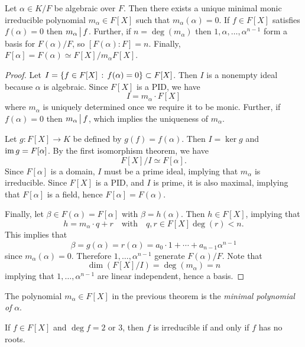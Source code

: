 \begin{thm}
	Let $\alpha \in K/F$ be algebraic over $F$. Then there exists a unique minimal monic irreducible polynomial $m_\alpha \in F[X]$ such that $m_\alpha(\alpha) = 0$. If $f \in F[X]$ satisfies $f(\alpha) = 0$ then $m_\alpha \,\big\vert\, f$. Further, if $n = \deg(m_\alpha)$ then $1, \alpha, \ldots, \alpha^{n-1}$ form a basis for $F(\alpha)/F$, so $[F(\alpha):F] = n$. Finally, $F[\alpha] = F(\alpha) \simeq F[X] \big / m_\alpha F[X]$.
\end{thm}
\begin{proof}
	Let $I = \left\{f \in F[X] \,:\, f(\alpha) = 0\right\} \subset F[X]$. Then $I$ is a nonempty ideal because $\alpha$ is algebraic. Since $F[X]$ is a PID, we have
	\[
		I = m_\alpha \cdot F[X] 
	\]
	where $m_\alpha$ is uniquely determined once we require it to be monic. Further, if $f(\alpha) = 0$ then $m_\alpha \,\big\vert\, f$, which implies the uniqueness of $m_\alpha$.
	
	Let $g: F[X] \to K$ be defined by $g(f) = f(\alpha)$. Then $I = \ker g$ and $\mathrm{im}\, g = F[\alpha]$. By the first isomorphism theorem, we have
	\[
		F[X] / I \simeq F[\alpha].
	\]
	Since $F[\alpha]$ is a domain, $I$ must be a prime ideal, implying that $m_\alpha$ is irreducible. Since $F[X]$ is a PID, and $I$ is prime, it is also maximal, implying that $F[\alpha]$ is a field, hence $F[\alpha] = F(\alpha)$.
	
	Finally, let $\beta \in F(\alpha) = F[\alpha]$ with $\beta = h(\alpha)$. Then $h \in F[X]$, implying that
	\[
		h = m_\alpha \cdot q + r \quad \text{with} \quad q,r \in F[X] \deg(r) < n.
	\]
	This implies that
	\[
		\beta = g(\alpha) = r(\alpha) = a_0 \cdot 1 + \cdots + a_{n-1} \alpha^{n-1}
	\]
	since $m_\alpha(\alpha) = 0$. Therefore $1, \ldots, \alpha^{n-1}$ generate $F(\alpha) / F$. Note that
	\[
		\dim(F[X] / I) = \deg(m_\alpha) = n
	\]
	implying that $1, \ldots, \alpha^{n-1}$ are linear independent, hence a basis.
\end{proof}

\begin{dfn}
	The polynomial $m_\alpha \in F[X]$ in the previous theorem is the \emph{minimal polynomial of } $\alpha$.
\end{dfn}

\begin{rem}
	If $f \in F[X]$ and $\deg f = 2$ or $3$, then $f$ is irreducible if and only if $f$ has no roots.
\end{rem}

